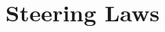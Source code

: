 \documentclass[letterpaper, preprint, paper,11pt]{AAS}	%
\begin{document}
	\section{Steering Laws} 
%	
%	
%
%	
%	
%	
%	
\end{document}

